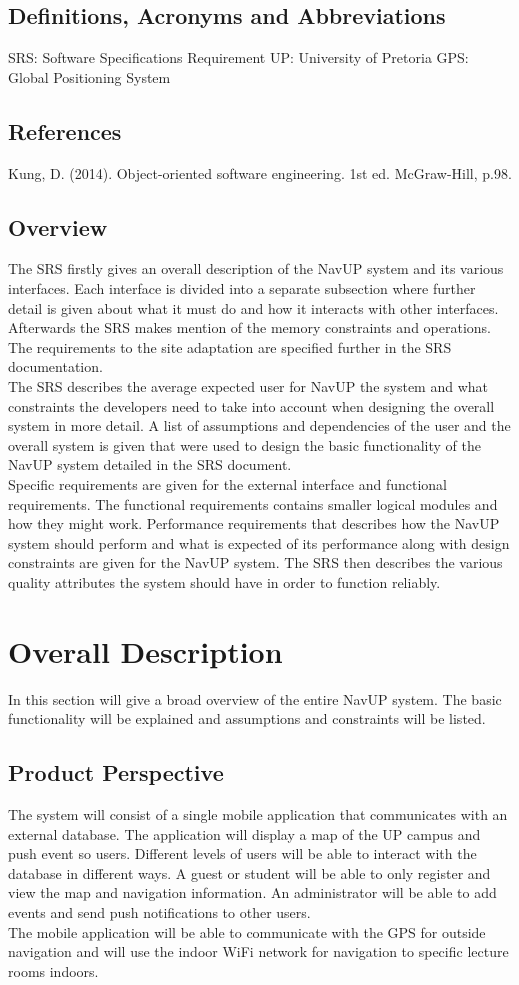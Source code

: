 \documentclass[a4paper,12pt]{article}
\begin{document}
\subsection{Definitions, Acronyms and Abbreviations}
SRS:	Software Specifications Requirement
UP:		University of Pretoria
GPS:	Global Positioning System
\subsection{References}
Kung, D. (2014). Object-oriented software engineering. 1st ed. McGraw-Hill, p.98.
\subsection{Overview}
The SRS firstly gives an overall description of the NavUP system and its various interfaces. Each interface is divided into a separate subsection where further detail is given about what it must do and how it interacts with other interfaces. Afterwards the SRS makes mention of the memory constraints and operations. The requirements to the site adaptation are specified further in the SRS documentation.\\
The SRS describes the average expected user for NavUP the system and what constraints the developers need to take into account when designing the overall system in more detail. A list of assumptions and dependencies of the user and the overall system is given that were used to design the basic functionality of the NavUP system detailed in the SRS document.\\
Specific requirements are given for the external interface and functional requirements. The functional requirements contains smaller logical modules and how they might work. Performance requirements that describes how the NavUP system should perform and what is expected of its performance along with design constraints are given for the NavUP system. The SRS then describes the various quality attributes the system should have in order to function reliably.\\ 
\section{Overall Description}
In this section will give a broad overview of the entire NavUP system. The basic functionality will be explained and assumptions and constraints will be listed.
\subsection{Product Perspective}
The system will consist of a single mobile application that communicates with an external database. The application will display a map of the UP campus and push event so users. Different levels of users will be able to interact with the database in different ways. A guest or student will be able to only register and view the map and navigation information. An administrator will be able to add events and send push notifications to other users.\\
The mobile application will be able to communicate with the GPS for outside navigation and will use the indoor WiFi network for navigation to specific lecture rooms indoors.
\end{document}
